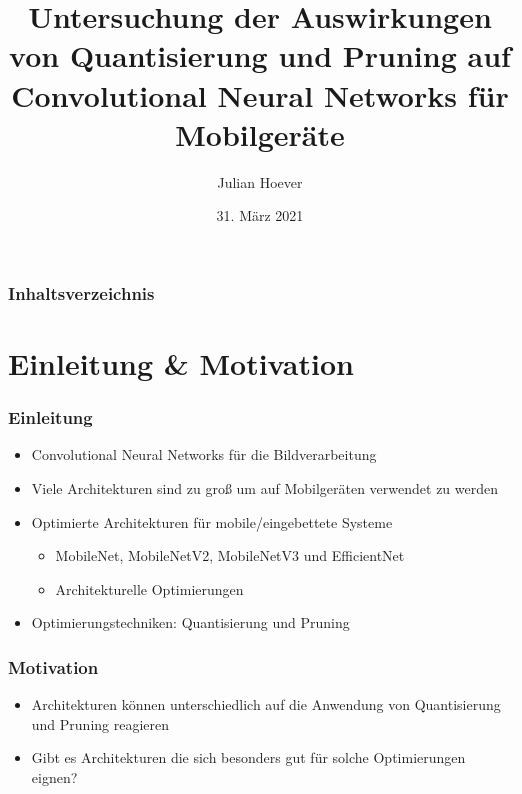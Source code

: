 \documentclass{beamer}
\title{Untersuchung der Auswirkungen von Quantisierung und Pruning auf Convolutional Neural Networks für Mobilgeräte}
\author{Julian Hoever}
\date{31. März 2021}
\begin{document}

\begin{frame}
\titlepage
\end{frame}




\begin{frame}
\frametitle{Inhaltsverzeichnis}

\tableofcontents
\end{frame}


\section{Einleitung \& Motivation}
\begin{frame}
\frametitle{Einleitung}

\begin{itemize}
	\item Convolutional Neural Networks für die Bildverarbeitung
	\item Viele Architekturen sind zu groß um auf Mobilgeräten verwendet zu werden
	\item Optimierte Architekturen für mobile/eingebettete Systeme
	\begin{itemize}
		\item MobileNet, MobileNetV2, MobileNetV3 und EfficientNet
		\item Architekturelle Optimierungen
	\end{itemize}
	\item Optimierungstechniken: Quantisierung und Pruning
\end{itemize}

\end{frame}


\begin{frame}
\frametitle{Motivation}

\begin{itemize}
	\item Architekturen können unterschiedlich auf die Anwendung von Quantisierung und Pruning reagieren
	\item Gibt es Architekturen die sich besonders gut für solche Optimierungen eignen?
\end{itemize}

\end{frame}



\end{document}
